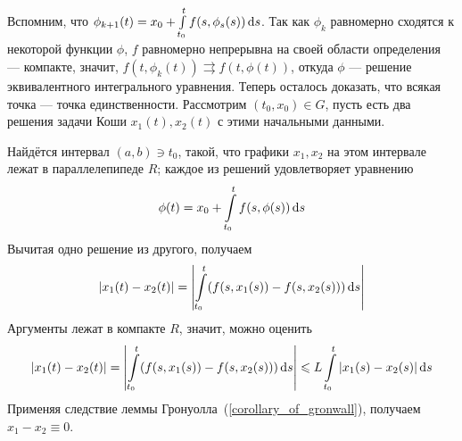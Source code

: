 \documentclass[a4paper]{report}
\begin{document}
{{        Вспомним, что $\phi_{k + 1}(t) = x_0 + \int\limits_{t_0}^{t}f(s, \phi_s(s))\operatorname{d}\! s$.
        Так как $\phi_k$ равномерно сходятся к некоторой функции $\phi$, $f$ равномерно непрерывна на своей области определения --- компакте, значит, $f(t, \phi_k(t)) \rightrightarrows f(t, \phi(t))$, откуда $\phi$ --- решение эквивалентного интегрального уравнения.
        \ok
        Теперь осталось доказать, что всякая точка --- точка единственности.
        Рассмотрим $(t_0, x_0) \in G$, пусть есть два решения задачи Коши $x_1(t), x_2(t)$ с этими начальными данными.

        Найдётся интервал $(a, b) \ni t_0$, такой, что графики $x_1, x_2$ на этом интервале лежат в параллелепипеде $R$; каждое из решений удовлетворяет уравнению
        \[\phi(t) = x_0 + \int\limits_{t_0}^{t}f(s, \phi(s))\operatorname{d}\! s\]
        Вычитая одно решение из другого, получаем
        \[|x_1(t) - x_2(t)| = \left|\int\limits_{t_0}^{t}(f(s, x_1(s)) - f(s, x_2(s)))\operatorname{d}\! s\right|\]
        Аргументы лежат в компакте $R$, значит, можно оценить
        \[|x_1(t) - x_2(t)| = \left|\int\limits_{t_0}^{t}(f(s, x_1(s)) - f(s, x_2(s)))\operatorname{d}\! s\right| \leqslant L\int\limits_{t_0}^{t}|x_1(s) - x_2(s)|\operatorname{d}\! s\]
        Применяя следствие леммы Гронуолла~(\ref{corollary_of_gronwall}), получаем $x_1 - x_2 \equiv 0$.
    }
    }
\end{document}
